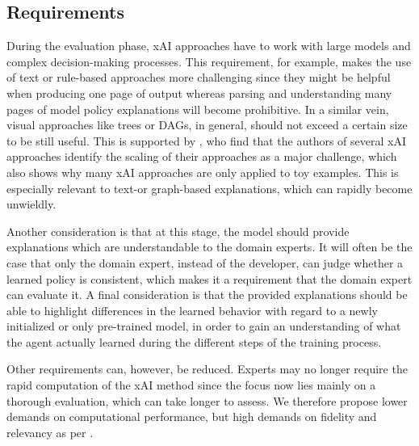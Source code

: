\documentclass[twoside,11pt]{article}
\begin{document}
\begin{enumerate}

\subsection{Requirements}
During the evaluation phase, xAI approaches have to work with large models and complex decision-making processes. This requirement, for example, makes the use of text or rule-based approaches \citep{TabrezHayes:2019:xRLTextualExplanations,HayesShah:2017:AutonomousPolicyExplanation} more challenging since they might be helpful when producing one page of output whereas parsing and understanding many pages of model policy explanations will become prohibitive. In a similar vein, visual approaches like trees or DAGs, in general, should not exceed a certain size to be still useful. 
This is supported by \citet{WellsBednarz:2021:xAIRLSurvey}, who find that the authors of several xAI approaches identify the scaling of their approaches as a major challenge, which also shows why many xAI approaches are only applied to toy examples. This is especially relevant to text-or graph-based explanations, which can rapidly become unwieldly.

Another consideration is that at this stage, the model should provide explanations which are understandable to the domain experts. It will often be the case that only the domain expert, instead of the developer, can judge whether a learned policy is consistent, which makes it a requirement that the domain expert can evaluate it.
A final consideration is that the provided explanations should be able to highlight differences in the learned behavior with regard to a newly initialized or only pre-trained model, in order to gain an understanding of what the agent actually learned during the different steps of the training process.

Other requirements can, however, be reduced. Experts may no longer require the rapid computation of the xAI method since the focus now lies mainly on a thorough evaluation, which can take longer to assess. We therefore propose lower demands on computational performance, but high demands on fidelity and relevancy as per \citet{milani2022survey}.


\end{enumerate}
\end{document}
